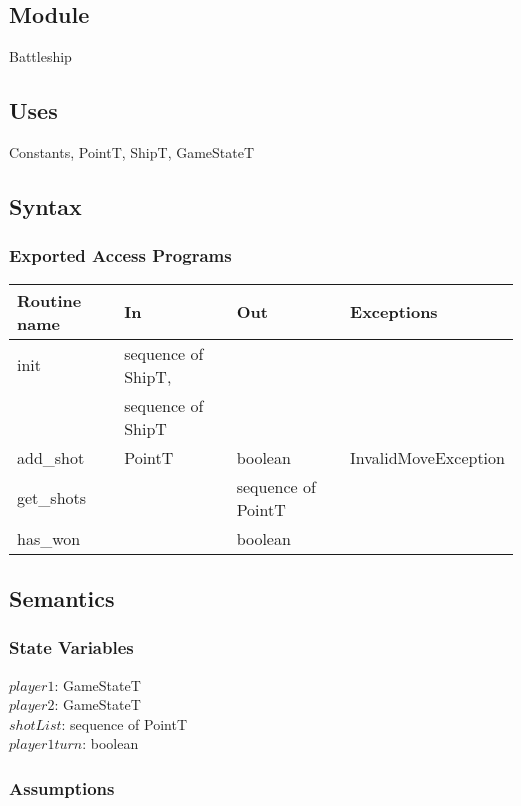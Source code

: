 \documentclass[12pt]{article}
\begin{document}
\subsection* {Module}

Battleship

\subsection* {Uses}

Constants, PointT, ShipT, GameStateT

\subsection* {Syntax}

\subsubsection* {Exported Access Programs}

\begin{tabular}{| l | l | l | p{5cm} |}
\hline
\textbf{Routine name} & \textbf{In} & \textbf{Out} & \textbf{Exceptions}\\
\hline
init & sequence of ShipT, & ~ & ~\\
~ & sequence of ShipT & ~ & ~\\
\hline
add\_shot & PointT & boolean & InvalidMoveException\\
\hline
get\_shots & ~ & sequence of PointT & ~\\
\hline
has\_won & ~ & boolean & ~\\
\hline

\end{tabular}

\subsection* {Semantics}

\subsubsection* {State Variables}

$\mathit{player1}$: GameStateT\\
$\mathit{player2}$: GameStateT\\
$shotList$: sequence of PointT\\
$\mathit{player1turn}$: boolean

\subsubsection* {Assumptions}
\end{document}
